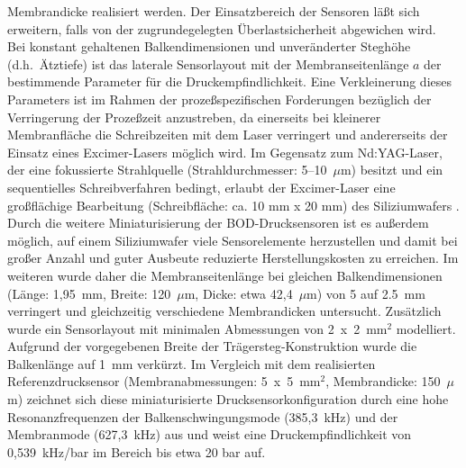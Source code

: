 Membrandicke realisiert werden. Der Einsatzbereich der Sensoren läßt sich
erweitern, falls von der zugrundegelegten Überlastsicherheit abgewichen
wird.\\
Bei konstant gehaltenen Balkendimensionen und unveränderter Steghöhe
(d.h.\ Ätztiefe) ist das laterale Sensorlayout mit der Membranseitenlänge
$a$ der bestimmende Parameter für die Druckempfindlichkeit. Eine
Verkleinerung dieses Parameters ist im Rahmen der prozeßspezifischen
Forderungen bezüglich der Verringerung der Prozeßzeit anzustreben, da
einerseits bei kleinerer Membranfläche die Schreibzeiten mit dem Laser
verringert und andererseits der Einsatz eines Excimer-Lasers möglich wird.
Im Gegensatz zum Nd:YAG-Laser, der eine
fokussierte Strahlquelle (Strahldurchmesser: 5--10~$\mu$m) besitzt und ein
sequentielles Schreibverfahren bedingt, erlaubt der Excimer-Laser eine
großflächige Bearbeitung (Schreibfläche: ca. 10 mm x 20 mm) des
Siliziumwafers \cite{Dissaxel}. Durch die weitere Miniaturisierung der
BOD-Drucksensoren ist es außerdem möglich, auf einem
Siliziumwafer viele Sensorelemente herzustellen und damit bei großer Anzahl
und guter Ausbeute reduzierte Herstellungskosten zu erreichen.
Im weiteren wurde daher die Membranseitenlänge bei gleichen
Balkendimensionen
(Länge: 1,95~mm, Breite: 120~$\mu$m, Dicke: etwa 42,4~$\mu$m)
von 5 auf 2.5~mm verringert und gleichzeitig verschiedene Membrandicken
untersucht. Zusätzlich wurde ein Sensorlayout mit minimalen
Abmessungen von 2~x~2~mm$^{2}$ modelliert. Aufgrund der vorgegebenen Breite
der Trägersteg-Konstruktion wurde die Balkenlänge auf 1~mm verkürzt.
Im Vergleich mit dem realisierten Referenzdrucksensor
(Membranabmessungen: 5~x~5~mm$^{2}$, Membrandicke: 150~$\mu$m)
zeichnet sich diese miniaturisierte Drucksensorkonfiguration durch eine
hohe Resonanzfrequenzen der Balkenschwingungsmode (385,3~kHz) und der
Membranmode (627,3~kHz) aus und weist eine Druckempfindlichkeit von
0,539~kHz/bar im Bereich bis etwa 20 bar auf.\\
